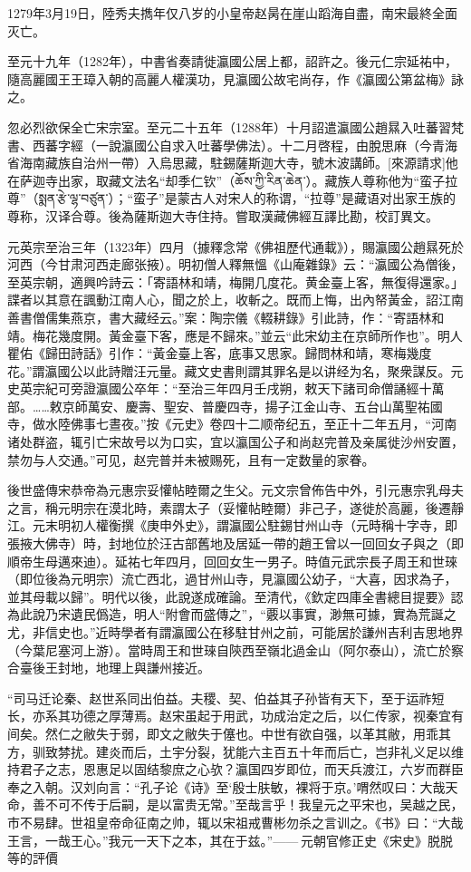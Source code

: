 1279年3月19日，陸秀夫擕年仅八岁的小皇帝赵昺在崖山蹈海自盡，南宋最終全面灭亡。

至元十九年（1282年），中書省奏請徙瀛國公居上都，詔許之。後元仁宗延祐中，隨高麗國王王璋入朝的高麗人權漢功，見瀛國公故宅尚存，作《瀛國公第盆梅》詠之。

忽必烈欲保全亡宋宗室。至元二十五年（1288年）十月詔遣瀛國公趙㬎入吐蕃習梵書、西蕃字經（一說瀛國公自求入吐蕃學佛法）。十二月啓程，由脫思麻（今青海省海南藏族自治州一帶）入烏思藏，駐錫薩斯迦大寺，號木波講師。[來源請求]他在萨迦寺出家，取藏文法名“却季仁钦”（ཆོས་ཀྱི་རིན་ཆེན་）。藏族人尊称他为“蛮子拉尊”（སྨན་རྩེ་ལྷ་བཙུན་）；“蛮子”是蒙古人对宋人的称谓，“拉尊”是藏语对出家王族的尊称，汉译合尊。後為薩斯迦大寺住持。嘗取漢藏佛經互譯比勘，校訂異文。

元英宗至治三年（1323年）四月（據釋念常《佛祖歷代通載》），賜瀛國公趙㬎死於河西（今甘肃河西走廊张掖）。明初僧人釋無慍《山庵雜錄》云：“瀛國公為僧後，至英宗朝，適興吟詩云：「寄語林和靖，梅開几度花。黄金臺上客，無復得還家。」諜者以其意在諷動江南人心，聞之於上，收斬之。既而上悔，出內帑黃金，詔江南善書僧儒集燕京，書大藏经云。”案：陶宗儀《輟耕錄》引此詩，作：“寄語林和靖。梅花幾度開。黃金臺下客，應是不歸來。”並云“此宋幼主在京師所作也”。明人瞿佑《歸田詩話》引作：“黃金臺上客，底事又思家。歸問林和靖，寒梅幾度花。”謂瀛國公以此詩贈汪元量。藏文史書則謂其罪名是以讲经为名，聚衆謀反。元史英宗紀可旁證瀛國公卒年：“至治三年四月壬戌朔，敕天下諸司命僧誦經十萬部。……敕京師萬安、慶壽、聖安、普慶四寺，揚子江金山寺、五台山萬聖祐國寺，做水陸佛事七晝夜。”按《元史》卷四十二顺帝纪五，至正十二年五月，“河南诸处群盗，辄引亡宋故号以为口实，宜以瀛国公子和尚赵完普及亲属徙沙州安置，禁勿与人交通。”可见，赵完普并未被赐死，且有一定数量的家眷。

後世盛傳宋恭帝為元惠宗妥懽帖睦爾之生父。元文宗曾佈告中外，引元惠宗乳母夫之言，稱元明宗在漠北時，素謂太子（妥懽帖睦爾）非己子，遂徙於高麗，後遷靜江。元末明初人權衡撰《庚申外史》，謂瀛國公駐錫甘州山寺（元時稱十字寺，即張掖大佛寺）時，封地位於汪古部舊地及居延一帶的趙王曾以一回回女子與之（即順帝生母邁來迪）。延祐七年四月，回回女生一男子。時值元武宗長子周王和世琜（即位後為元明宗）流亡西北，過甘州山寺，見瀛國公幼子，“大喜，因求為子，並其母載以歸”。明代以後，此說遂成確論。至清代，《欽定四庫全書總目提要》認為此說乃宋遺民僞造，明人“附會而盛傳之”，“覈以事實，渺無可據，實為荒誕之尤，非信史也。”近時學者有謂瀛國公在移駐甘州之前，可能居於謙州吉利吉思地界（今葉尼塞河上游）。當時周王和世琜自陝西至嶺北過金山（阿尔泰山），流亡於察合臺後王封地，地理上與謙州接近。

“司马迁论秦、赵世系同出伯益。夫稷、契、伯益其子孙皆有天下，至于运祚短长，亦系其功德之厚薄焉。赵宋虽起于用武，功成治定之后，以仁传家，视秦宜有间矣。然仁之敝失于弱，即文之敝失于僿也。中世有欲自强，以革其敝，用乖其方，驯致棼扰。建炎而后，土宇分裂，犹能六主百五十年而后亡，岂非礼义足以维持君子之志，恩惠足以固结黎庶之心欤？瀛国四岁即位，而天兵渡江，六岁而群臣奉之入朝。汉刘向言：“孔子论《诗》至‘殷士肤敏，裸将于京。’喟然叹曰：大哉天命，善不可不传于后嗣，是以富贵无常。”至哉言乎！我皇元之平宋也，吴越之民，市不易肆。世祖皇帝命征南之帅，辄以宋祖戒曹彬勿杀之言训之。《书》曰：“大哉王言，一哉王心。”我元一天下之本，其在于兹。”—— 元朝官修正史《宋史》脱脱等的評價


